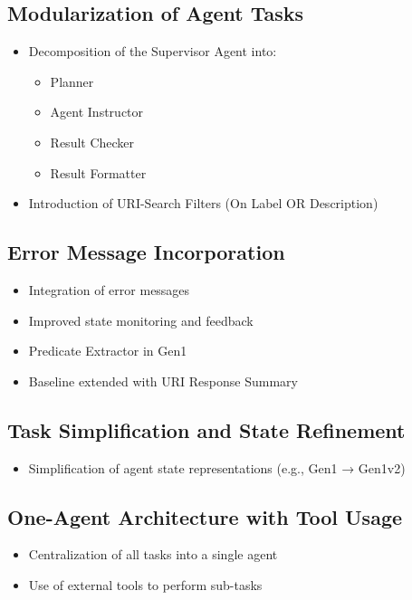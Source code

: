 \documentclass[a4paper,oneside,bibliography=totoc]{scrbook}
\begin{document}
\subsection{Modularization of Agent Tasks}
\label{subsec:modularization_agent_tasks}
\begin{itemize}
  \item Decomposition of the Supervisor Agent into:
        \begin{itemize}
          \item Planner
          \item Agent Instructor
          \item Result Checker
          \item Result Formatter
        \end{itemize}

  \item Introduction of URI-Search Filters (On Label OR Description)
\end{itemize}

\subsection{Error Message Incorporation}
\label{subsec:error_message_incorporation}
\begin{itemize}
  \item Integration of error messages
  \item Improved state monitoring and feedback
  \item Predicate Extractor in Gen1
  \item Baseline extended with URI Response Summary
\end{itemize}

\subsection{Task Simplification and State Refinement}
\label{subsec:task_simplification_state_refinement}
\begin{itemize}
  \item Simplification of agent state representations (e.g., Gen1 → Gen1v2)
\end{itemize}

\subsection{One-Agent Architecture with Tool Usage}
\label{subsec:one_agent_architecture_tool_usage}
\begin{itemize}
  \item Centralization of all tasks into a single agent
  \item Use of external tools to perform sub-tasks
\end{itemize}
\end{document}
